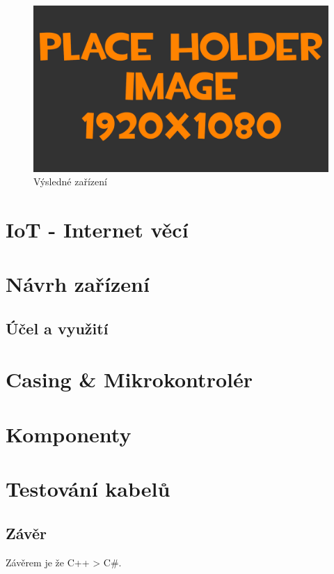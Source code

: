 \documentclass[12pt,a4paper,titlepage]{scrreprt}
\begin{document}
	\begin{figure}[h!]
		\centering
		\includegraphics[width=\textwidth]{pictures/placeHolderFHD.png}
	    	\caption{Výsledné zařízení}
	   	\label{fig:projektFinal}
	\end{figure}
	
	\chapter{IoT - Internet věcí}
	
	
	\chapter{Návrh zařízení}
	\section{Účel a využití}
	
	\chapter{Casing \& Mikrokontrolér}
	
	\chapter{Komponenty}
	
	\chapter{Testování kabelů}
	
	
	 \section*{Závěr}
	Závěrem je že C++ > C\#.
\end{document}
